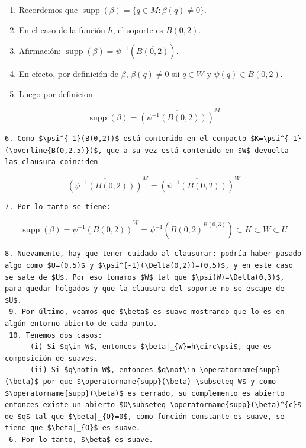 \begin{bookproof}{}
\begin{itemize}
\begin{enumerate}
\item Recordemos que $\operatorname{supp}(\beta)=\overline{\{q\in M:\beta(q)\neq 0\}}$.
\item En el caso de la función $h$, el soporte es $\overline{B(0,2)}$.
\item Afirmación: $\operatorname{supp}(\beta)=\psi^{-1}(\overline{B(0,2)})$.
\item En efecto, por definición de $\beta$, $\beta(q)\neq 0$ sii $q\in W$ y $\psi(q)\in B(0,2)$.
\item Luego por definicion
\end{enumerate}
\end{itemize}
\[
\operatorname{supp}(\beta)=\overline{(\psi^{-1}(B(0,2)))}^{M}
\]
\begin{Verbatim}[fontsize=\small]
 6. Como $\psi^{-1}(B(0,2))$ está contenido en el compacto $K=\psi^{-1}(\overline{B(0,2.5)})$, que a su vez está contenido en $W$ devuelta las clausura coinciden 
\end{Verbatim}
\[
\overline{(\psi^{-1}(B(0,2)))}^{M}=\overline{(\psi^{-1}(B(0,2)))}^{W}
\]
\begin{Verbatim}[fontsize=\small]
 7. Por lo tanto se tiene: 
\end{Verbatim}
\[
\operatorname{supp}(\beta)=\overline{\psi ^{-1}(B(0,2)) }^{W}=\psi^{-1}(\overline{B(0,2)}^{B(0,3)}) \subset K\subset W\subset U
\]
\begin{Verbatim}[fontsize=\small]
 8. Nuevamente, hay que tener cuidado al clausurar: podría haber pasado algo como $U=(0,5)$ y $\psi^{-1}(\Delta(0,2))=(0,5)$, y en este caso se sale de $U$. Por eso tomamos $W$ tal que $\psi(W)=\Delta(0,3)$, para quedar holgados y que la clausura del soporte no se escape de $U$.  
 9. Por último, veamos que $\beta$ es suave mostrando que lo es en algún entorno abierto de cada punto.  
 10. Tenemos dos casos:  
 	- (i) Si $q\in W$, entonces $\beta|_{W}=h\circ\psi$, que es composición de suaves.
 	- (ii) Si $q\notin W$, entonces $q\not\in \operatorname{supp}(\beta)$ por que $\operatorname{supp}(\beta) \subseteq W$ y como $\operatorname{supp}(\beta)$ es cerrado, su complemento es abierto entonces existe un abierto $O\subseteq \operatorname{supp}(\beta)^{c}$ de $q$ tal que $\beta|_{O}=0$, como función constante es suave, se tiene que $\beta|_{O}$ es suave. 
 6. Por lo tanto, $\beta$ es suave.
\end{Verbatim}
\bookqed
\end{bookproof}
\label{blk:45cd5d}
